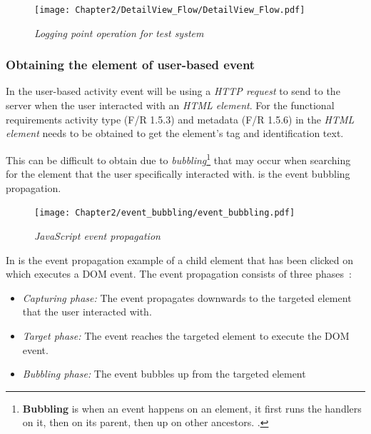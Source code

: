\clearpage

\begin{figure}[!htb]
	\centering %
	\texttt{[image: Chapter2/DetailView\_Flow/DetailView\_Flow.pdf]}
	\caption[Logging point operation for test system]
	{\textit{Logging point operation for test system}}\label{fig:ch3_loggingProcess}
\end{figure}

\clearpage

\subsubsection{Obtaining the element of user-based event}\label{sec:ch2_ElementObtaining}
In  the user-based activity event will be using a \textit{HTTP request} to send to the server when the user interacted with an \textit{HTML element}. For the functional requirements activity type (F/R 1.5.3) and metadata (F/R 1.5.6) in  the \textit{HTML element} needs to be obtained to get the element's tag and identification text.\par This can be difficult to obtain due to \textit{bubbling}\footnote{\textbf{Bubbling} is when an event happens on an element, it first runs the handlers on it, then on its parent, then up on other ancestors. \cite{EventBubbling}.} that may occur when searching for the element that the user specifically interacted with.  is the event bubbling propagation.

\begin{figure}[!htb]
	\centering %
	\texttt{[image: Chapter2/event\_bubbling/event\_bubbling.pdf]}
	\caption[JavaScript event propagation]
	{\textit{JavaScript event propagation~\cite{EventBubbling}}}\label{fig:ch2_event_bubbling}
\end{figure}

In  is the event propagation example of a child element that has been clicked on which executes a DOM event. The event propagation consists of three phases~\cite{EventBubbling}:

\begin{itemize}
	\item \textit{Capturing phase:} The event propagates downwards to the targeted element that the user interacted with.
	\item \textit{Target phase:} The event reaches the targeted element to execute the DOM event.
	\item \textit{Bubbling phase:} The event bubbles up from the targeted element
\end{itemize}

